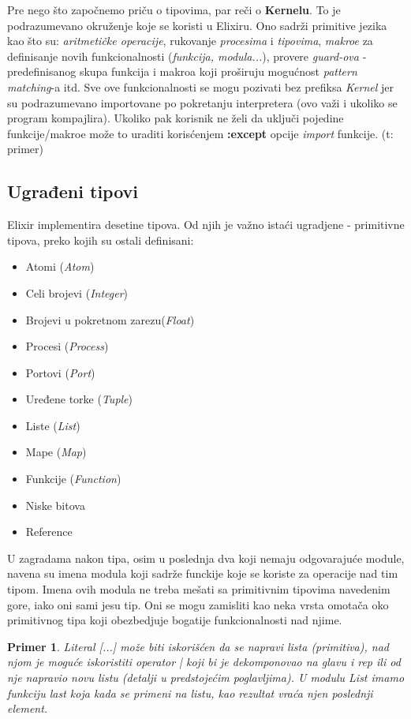 \documentclass[a4paper]{article}
\newtheorem{primer}{Primer}[section]
\begin{document}
Pre nego što započnemo priču o tipovima, par reči o \textbf{Kernelu}. To je podrazumevano okruženje koje se koristi u Elixiru. Ono sadrži primitive jezika kao što su: \textit{aritmetičke operacije}, rukovanje \textit{procesima} i \textit{tipovima}, \textit{makroe} za definisanje novih funkcionalnosti (\textit{funkcija, modula...}), provere \textit{guard-ova} - predefinisanog skupa funkcija i makroa koji proširuju mogućnost \textit{pattern matching}-a itd. Sve ove funkcionalnosti se mogu pozivati bez prefiksa \textit{Kernel} jer su podrazumevano importovane po pokretanju interpretera (ovo važi i ukoliko se program kompajlira). Ukoliko pak korisnik ne želi da uključi pojedine funkcije/makroe može to uraditi korisćenjem \textbf{:except} opcije \textit{import} funkcije. (t: primer)
\label{sec:osobine}
\subsection{Ugrađeni tipovi}
\label{sec:tipovi}
Elixir implementira desetine tipova. Od njih je važno istaći ugradjene - primitivne tipova, preko kojih su ostali definisani:
\begin{itemize}
  \item Atomi (\textit{Atom})
  \item Celi brojevi (\textit{Integer})
  \item Brojevi u pokretnom zarezu(\textit{Float})
  \item Procesi (\textit{Process})
  \item Portovi (\textit{Port})
  \item Uređene torke (\textit{Tuple})
  \item Liste (\textit{List})
  \item Mape (\textit{Map})
  \item Funkcije (\textit{Function})
  \item Niske bitova 
  \item Reference
\end{itemize}

U zagradama nakon tipa, osim u poslednja dva koji nemaju odgovarajuće module, navena su imena modula koji sadrže funckije koje se koriste za operacije nad tim tipom. Imena ovih modula ne treba mešati sa primitivnim tipovima navedenim gore, iako oni sami jesu tip. Oni se mogu zamisliti kao neka vrsta omotača oko primitivnog tipa koji obezbedjuje bogatije funkcionalnosti nad njime. 
\begin{primer}
Literal [...] može biti iskorišćen da se napravi lista (primitiva), nad njom je moguće iskoristiti operator | koji bi je dekomponovao na glavu i rep ili od nje napravio novu listu (detalji u predstojećim poglavljima). U modulu \textit{List} imamo funkciju \textit{last} koja kada se primeni na listu, kao rezultat vraća njen poslednji element.
\end{primer}
\end{document}
